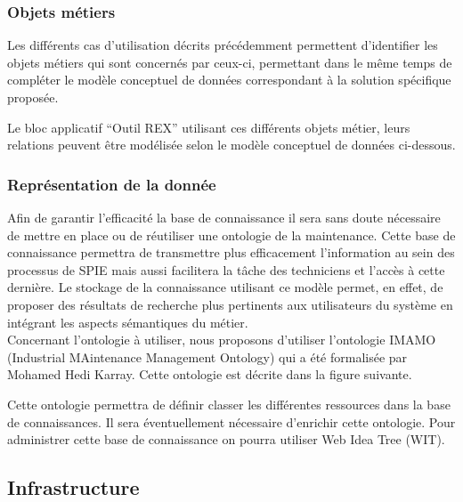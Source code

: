 \subsubsection{Objets métiers}

Les différents cas d’utilisation décrits précédemment permettent d’identifier les objets métiers qui sont concernés par ceux-ci, permettant dans le même temps de compléter le modèle conceptuel de données correspondant à la solution spécifique proposée.


Le bloc applicatif “Outil REX” utilisant ces différents objets métier, leurs relations peuvent être modélisée selon le modèle conceptuel de données ci-dessous.


\subsubsection{Représentation de la donnée}

Afin de garantir l’efficacité la base de connaissance il sera sans doute nécessaire de mettre en place ou de réutiliser une ontologie de la maintenance. Cette base de connaissance permettra de transmettre plus efficacement l’information au sein des processus de SPIE mais aussi facilitera la tâche des techniciens et l’accès à cette dernière. Le stockage de la connaissance utilisant ce modèle permet, en effet, de proposer des résultats de recherche plus pertinents aux utilisateurs du système en intégrant les aspects sémantiques du métier. \\

Concernant l’ontologie à utiliser,  nous proposons d’utiliser l’ontologie IMAMO (Industrial MAintenance Management Ontology) qui a été formalisée par Mohamed Hedi Karray. Cette ontologie est décrite dans la figure suivante. 


Cette ontologie permettra de définir classer les différentes ressources dans la base de connaissances. Il sera éventuellement nécessaire d’enrichir cette ontologie. Pour administrer cette base de connaissance on pourra utiliser Web Idea Tree (WIT).


\subsection{Infrastructure}

